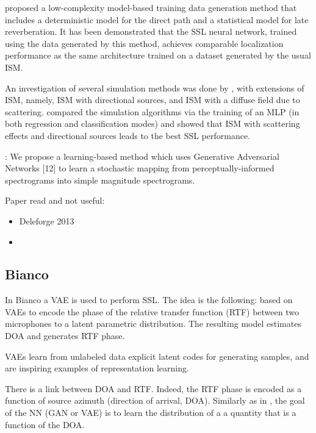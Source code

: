 \documentclass{article}
\begin{document}
\cite{hubner2021efficient} proposed a low-complexity model-based training data generation method that includes a deterministic model for the direct path and a statistical model for late reverberation. It has been demonstrated that the SSL neural network, trained using the data generated by this method, achieves comparable localization performance as the same architecture trained on a dataset generated by the usual ISM.

An investigation of several simulation methods was done by \cite{gelderblom2021synthetic}, with extensions of ISM, namely, ISM with directional sources, and ISM with a diffuse field due to scattering. \cite{gelderblom2021synthetic} compared the simulation algorithms via the training of an MLP (in both regression and classification modes) and showed that ISM with scattering effects and directional sources leads to the best SSL performance.

\cite{neekhara2019expediting} : We propose a learning-based method which uses Generative Adversarial Networks [12] to learn a stochastic mapping from perceptually-informed spectrograms into simple magnitude spectrograms.

Paper read and not useful:

\begin{itemize}
    \item Deleforge 2013 \cite{deleforge2013variational}
    \item 
\end{itemize}

\subsection{Bianco}

In Bianco a VAE is used to perform SSL. The idea is the following: based on VAEs to encode the phase of the relative transfer function (RTF) between two microphones to a latent parametric distribution. The resulting model estimates DOA and generates RTF phase.

VAEs learn from unlabeled data explicit latent codes for generating samples, and are
inspiring examples of representation learning. 

There is a link between DOA and RTF. Indeed, the RTF phase is encoded as a function of source azimuth (direction of arrival, DOA). Similarly as in \cite{gerstoft2020parametric}, the goal of the NN (GAN or VAE) is to learn the distribution of a a quantity that is a function of the DOA. 
\end{document}

